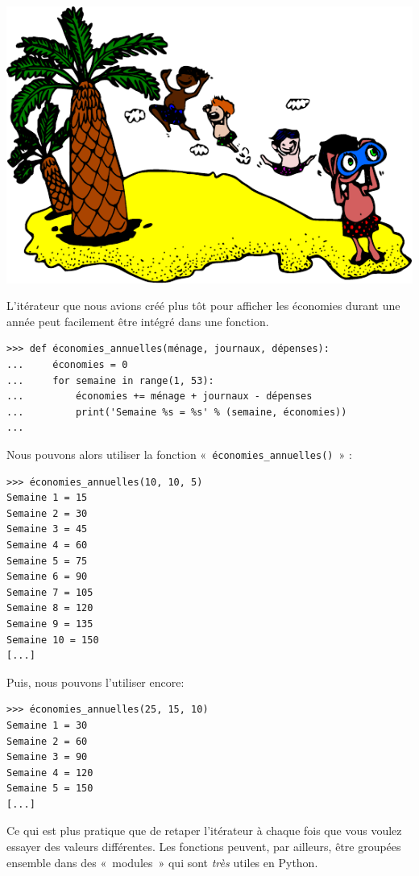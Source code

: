 \begin{center}
 \includegraphics{images/ile.pdf}
\end{center}

L'itérateur que nous avions créé plus tôt pour afficher les économies durant une année peut facilement être intégré dans une fonction.

\begin{Verbatim}[frame=single,rulecolor=\color{mbleu}, label=à taper]
>>> def économies_annuelles(ménage, journaux, dépenses):
...     économies = 0
...     for semaine in range(1, 53):
...         économies += ménage + journaux - dépenses
...         print('Semaine %s = %s' % (semaine, économies))
...
\end{Verbatim}

Nous pouvons alors utiliser la fonction « \texttt{économies\_annuelles()} » :

\begin{Verbatim}[frame=single,rulecolor=\color{mbleu}, label=à taper]
>>> économies_annuelles(10, 10, 5)
Semaine 1 = 15
Semaine 2 = 30
Semaine 3 = 45
Semaine 4 = 60
Semaine 5 = 75
Semaine 6 = 90
Semaine 7 = 105
Semaine 8 = 120
Semaine 9 = 135
Semaine 10 = 150
[...]
\end{Verbatim}

Puis, nous pouvons l'utiliser encore:

\begin{Verbatim}[frame=single,rulecolor=\color{mbleu}, label=à taper]
>>> économies_annuelles(25, 15, 10)
Semaine 1 = 30
Semaine 2 = 60
Semaine 3 = 90
Semaine 4 = 120
Semaine 5 = 150
[...]
\end{Verbatim}

Ce qui est plus pratique que de retaper l'itérateur à chaque fois que vous voulez essayer des valeurs différentes.
Les fonctions peuvent, par ailleurs, être groupées ensemble dans des « modules »  qui sont \emph{très} utiles en Python.\\

